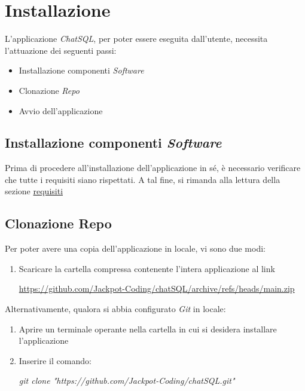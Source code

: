 \documentclass[5pt]{article}
\begin{document}
	\section{Installazione}
		L'applicazione \textit{ChatSQL}, per poter essere eseguita dall'utente, necessita l'attuazione dei seguenti passi:
		\begin{itemize}
			\item Installazione componenti \textit{Software}
			\item Clonazione \textit{Repo}
			\item Avvio dell'applicazione
		\end{itemize}

		\subsection{Installazione componenti \textit{Software}}
			Prima di procedere all'installazione dell'applicazione in sé, è necessario verificare che tutte i requisiti siano rispettati.
			A tal fine, si rimanda alla lettura della sezione \hyperref[sec:requisiti]{requisiti}

        \subsection{Clonazione Repo}
			Per poter avere una copia dell'applicazione in locale, vi sono due modi:
			\begin{enumerate}
				\item Scaricare la cartella compressa contenente l'intera applicazione al link
					\begin{center}
						\url{https://github.com/Jackpot-Coding/chatSQL/archive/refs/heads/main.zip}
					\end{center}
			\end{enumerate}
			Alternativamente, qualora si abbia configurato \textit{Git} in locale:
			\begin{enumerate}
				\item Aprire un terminale operante nella cartella in cui si desidera installare l'applicazione
				\item Inserire il comando:
					\begin{center}
						\textit{git clone "https://github.com/Jackpot-Coding/chatSQL.git"}
					\end{center}
			\end{enumerate}
\end{document}

